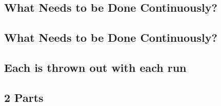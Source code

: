 \documentclass[12pt,notitlepage]{article}
\begin{document}
\begin{s5presentation}
  \W \begin{s5slide}
    \W \section{What Needs to be Done Continuously?}
  \W \end {s5slide}
  \W \begin{s5slide}
    \W \section{What Needs to be Done Continuously?}
  \W \end {s5slide}
  \W \begin{s5slide}
    \W \section{Each is thrown out with each run}
  \W \end {s5slide}
  \W \begin{s5slide}
    \W \section{2 Parts}
  \W \end {s5slide}
  \W \end{s5presentation}
\end{document}
